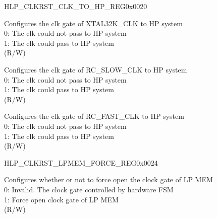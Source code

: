 \begin{register}{H}{LP\_CLKRST\_CLK\_TO\_HP\_REG}{0x0020}\label{regdesc:LPCLKRSTCLKTOHPREG}
%
%
%
%
%
\regnewline%
\begin{regdesc}\begin{reglist}
\label{fielddesc:LPCLKRSTICGHPXTAL32K}\item [LP\_CLKRST\_ICG\_HP\_XTAL32K] Configures the clk gate of XTAL32K\_CLK to HP system\\
0: The clk could not pass to HP system \\
1: The clk could pass to HP system  \\ (R/W)
\label{fielddesc:LPCLKRSTICGHPSOSC}\item [LP\_CLKRST\_ICG\_HP\_SOSC] Configures the clk gate of RC\_SLOW\_CLK to HP system\\
0: The clk could not pass to HP system \\
1: The clk could pass to HP system  \\ (R/W)
\label{fielddesc:LPCLKRSTICGHPFOSC}\item [LP\_CLKRST\_ICG\_HP\_FOSC] Configures the clk gate of RC\_FAST\_CLK to HP system\\
0: The clk could not pass to HP system \\
1: The clk could pass to HP system  \\ (R/W)
\end{reglist}\end{regdesc}
\end{register}


\begin{register}{H}{LP\_CLKRST\_LPMEM\_FORCE\_REG}{0x0024}\label{regdesc:LPCLKRSTLPMEMFORCEREG}
%
%
\regnewline%
\begin{regdesc}\begin{reglist}
\label{fielddesc:LPCLKRSTLPMEMCLKFORCEON}\item [LP\_CLKRST\_LPMEM\_CLK\_FORCE\_ON] Configures whether or not to force open the clock gate of LP MEM\\
0: Invalid. The clock gate controlled by hardware FSM \\
1: Force open clock gate of LP MEM  \\ (R/W)
\end{reglist}\end{regdesc}
\end{register}



